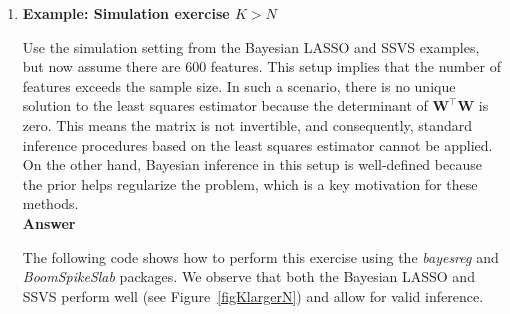 \begin{enumerate}[leftmargin=*]
\begin{tcolorbox}[enhanced,width=4.67in,center upper,
	fontupper=\large\bfseries,drop shadow southwest,sharp corners]
	\textit{R code. Application: Drivers of civil conflict in the post-Cold War era using a logit model}
	\begin{VF}
		\begin{lstlisting}[language=R]
rm(list = ls())
set.seed(010101)
Data <- read.csv("https://raw.githubusercontent.com/BEsmarter-consultancy/BSTApp/refs/heads/master/DataApp/Conflict.csv", sep = ",", header = TRUE, quote = "")

# Scale regressors
W <- as.matrix(scale(Data[, -c(1, 2)]))
niter <- 15000
y <- unlist(Data[, 2])

# Logit model
SSBoomLogit <- logit.spike(y ~ W, niter = niter)
ModelsLogit <- SSBoomLogit$beta != 0
PIPLogit <- colMeans(SSBoomLogit$beta != 0)
# Convert the logical matrix to a data frame and then to a tibble
df <- as.data.frame(ModelsLogit); df_tbl <- as_tibble(df)
# Count identical rows
row_counts <- df_tbl %>% count(across(everything()), name = "frequency") %>% arrange(desc(frequency))
colnames(W)
# Get indices of best model
for(l in 1:5) {
	print(which(row_counts[l,] == 1))
	print(row_counts[l, dim(row_counts)[2]]/niter)
}
# Coefficients
SummarySSlogit <- summary(coda::mcmc(SSBoomLogit$beta))
SummarySSlogit
		\end{lstlisting}
	\end{VF}
\end{tcolorbox} 

\item \textbf{Example: Simulation exercise $K > N$}

Use the simulation setting from the Bayesian LASSO and SSVS examples, but now assume there are 600 features. This setup implies that the number of features exceeds the sample size. In such a scenario, there is no unique solution to the least squares estimator because the determinant of $\mathbf{W}^{\top} \mathbf{W}$ is zero. This means the matrix is not invertible, and consequently, standard inference procedures based on the least squares estimator cannot be applied. On the other hand, Bayesian inference in this setup is well-defined because the prior helps regularize the problem, which is a key motivation for these methods.\\

\textbf{Answer}

The following code shows how to perform this exercise using the \textit{bayesreg} and \textit{BoomSpikeSlab} packages. We observe that both the Bayesian LASSO and SSVS perform well (see Figure~\ref{figKlargerN}) and allow for valid inference.


\end{enumerate}
